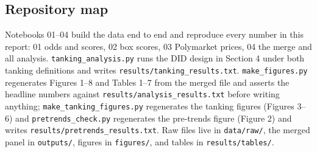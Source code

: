 \documentclass[12pt,letterpaper]{article}
\begin{document}
\subsection{Repository map}

Notebooks 01--04 build the data end to end and reproduce every number in
this report: 01 odds and scores, 02 box scores, 03 Polymarket prices, 04 the
merge and all analysis. \texttt{tanking\_analysis.py} runs the DID design in
Section 4 under both tanking definitions and writes
\texttt{results/tanking\_results.txt}. \texttt{make\_figures.py} regenerates
Figures 1--8 and Tables 1--7 from the merged file and asserts the headline
numbers against \texttt{results/analysis\_results.txt} before writing
anything; \texttt{make\_tanking\_figures.py} regenerates the tanking
figures (Figures 3--6) and \texttt{pretrends\_check.py} regenerates the
pre-trends figure (Figure 2) and writes
\texttt{results/pretrends\_results.txt}. Raw
files live in \texttt{data/raw/}, the merged panel in \texttt{outputs/},
figures in \texttt{figures/}, and tables in \texttt{results/tables/}.
\end{document}
